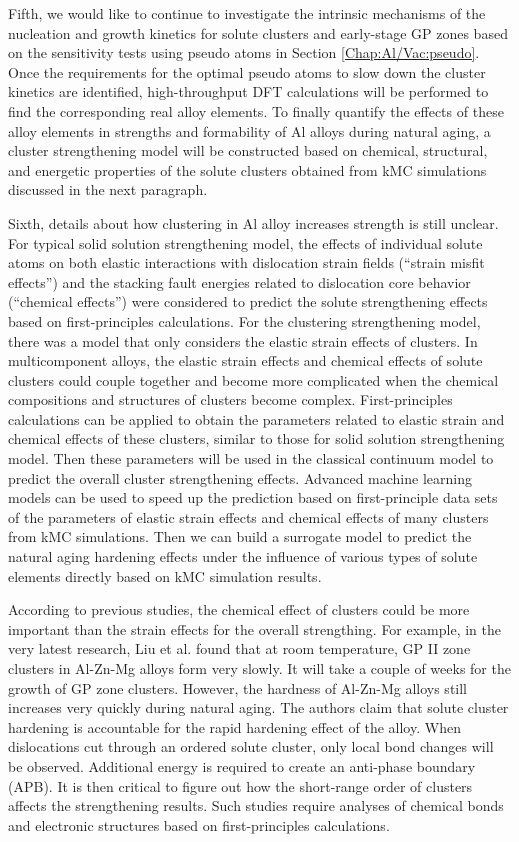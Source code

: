 Fifth, we would like to continue to investigate the intrinsic mechanisms of the nucleation and growth kinetics for solute clusters and early-stage GP zones based on the sensitivity tests using pseudo atoms in Section \ref{Chap:Al/Vac:pseudo}. Once the requirements for the optimal pseudo atoms to slow down the cluster kinetics are identified, high-throughput DFT calculations will be performed to find the corresponding real alloy elements. To finally quantify the effects of these alloy elements in strengths and formability of Al alloys during natural aging, a cluster strengthening model will be constructed based on chemical, structural, and energetic properties of the solute clusters obtained from \ac{kMC} simulations discussed in the next paragraph.

Sixth, details about how clustering in Al alloy increases strength is still unclear. For typical solid solution strengthening model, the effects of individual solute atoms on both elastic interactions with dislocation strain fields (``strain misfit effects'') and the stacking fault energies related to dislocation core behavior (``chemical effects'') were considered to predict the solute strengthening effects based on first-principles calculations\cite{yasi2010first}. For the clustering strengthening model, there was a model that only considers the elastic strain effects of clusters\cite{zhao2014cluster}. In multicomponent alloys, the elastic strain effects and chemical effects of solute clusters could couple together and become more complicated when the chemical compositions and structures of clusters become complex. First-principles calculations can be applied to obtain the parameters related to elastic strain and chemical effects of these clusters, similar to those for solid solution strengthening model\cite{yasi2010first}.  Then these parameters will be used in the classical continuum model to predict the overall cluster strengthening effects. Advanced machine learning models can be used to speed up the prediction based on first-principle data sets of the parameters of elastic strain effects and chemical effects of many clusters from \ac{kMC} simulations. Then we can build a surrogate model to predict the natural aging hardening effects under the influence of various types of solute elements directly based on \ac{kMC} simulation results.

According to previous studies, the chemical effect of clusters could be more important than the strain effects for the overall strengthing. For example, in the very latest research, Liu et al. \cite{liu2020formation} found that at room temperature, \ac{GP} II zone clusters in Al-Zn-Mg alloys form very slowly. It will take a couple of weeks for the growth of \ac{GP} zone clusters. However, the hardness of Al-Zn-Mg alloys still increases very quickly during natural aging. The authors claim that solute cluster hardening is accountable for the rapid hardening effect of the alloy. When dislocations cut through an ordered solute cluster, only local bond changes will be observed. Additional energy is required to create an anti-phase boundary (APB). It is then critical to figure out how the short-range order of clusters affects the strengthening results.  Such studies require analyses of chemical bonds and electronic structures based on first-principles calculations. 